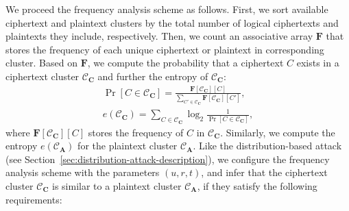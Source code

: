 \documentclass[bachelor]{thesis-uestc}
\begin{document}
We proceed the frequency analysis scheme as follows. First, we  sort available ciphertext and plaintext clusters by the total number of logical  ciphertexts and plaintexts they include, respectively. Then, we count an associative array $\mathbf{F}$ that stores the frequency of each unique ciphertext or plaintext in  corresponding cluster. Based on $\mathbf{F}$, we compute the probability that a  ciphertext $C$ exists in a ciphertext cluster $\mathcal{C}_\mathbf{C}$ and further the   
entropy of $\mathcal{C}_\mathbf{C}$:      
\begin{eqnarray*}
    \Pr[C \in \mathcal{C}_\mathbf{C}] = \frac{\mathbf{F}[\mathcal{C}_\mathbf{C}][C]}{\sum_{C' \in \mathcal{C}_\mathbf{C}} \mathbf{F}[\mathcal{C}_\mathbf{C}][C']}, \\
    e(\mathcal{C}_\mathbf{C}) = \sum_{C \in \mathcal{C}_\mathbf{C}} \log_2 \frac{1}{\Pr[C \in \mathcal{C}_\mathbf{C}]},  
\end{eqnarray*}
where   
$\mathbf{F}[\mathcal{C}_\mathbf{C}][C]$  stores the frequency of $C$ in $\mathcal{C}_\mathbf{C}$. Similarly, we  compute the entropy $e(\mathcal{C}_\mathbf{A})$ for the plaintext cluster $\mathcal{C}_\mathbf{A}$.   
Like the distribution-based attack (see Section~\ref{sec:distribution-attack-description}), we configure the frequency analysis scheme with the parameters $(u, r, t)$, and infer that the ciphertext cluster $\mathcal{C}_\mathbf{C}$ is similar to a plaintext cluster $\mathcal{C}_\mathbf{A}$, if they satisfy the following requirements:
\end{document}
